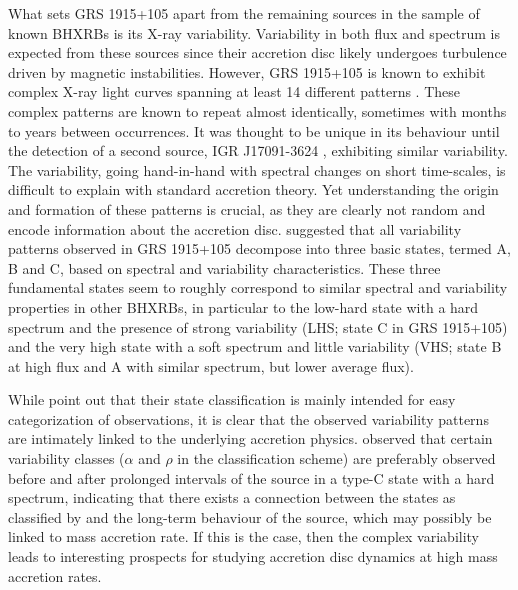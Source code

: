 \documentclass[12pt]{emulateapj}
\begin{document}
What sets GRS 1915+105 apart from the remaining sources in the sample of known BHXRBs is its X-ray variability. Variability in both flux and spectrum is expected from these sources since their accretion disc likely undergoes turbulence driven by magnetic instabilities. However, GRS 1915+105 is known to exhibit complex X-ray light curves spanning at least 14 different patterns \citep{belloni2000, kleinwolt2002, hannikainen2003, hannikainen2005}. These complex patterns are known to repeat almost identically, sometimes with months to years between occurrences. It was thought to be unique in its behaviour until the detection of a second source, IGR J17091-3624 \citep{altamirano2011}, exhibiting similar variability. 
The variability, going hand-in-hand with spectral changes on short time-scales, is difficult to explain with standard accretion theory. Yet understanding the origin and formation of these patterns is crucial, as they are clearly not random and encode information about the accretion disc. \citet{belloni1997a, belloni1997b, belloni2000} suggested that all variability patterns observed in GRS 1915+105 decompose into three basic states, termed A, B and C, based on spectral and variability characteristics. These three fundamental states seem to roughly correspond to similar spectral and variability properties in other BHXRBs, in particular to the low-hard state with a hard spectrum and the presence of strong variability (LHS; state C in GRS 1915+105) and the very high state with a soft spectrum and little variability (VHS; state B at high flux and A with similar spectrum, but lower average flux).

While \citet{belloni2000} point out that their state classification is mainly intended for easy categorization of observations, it is clear that the observed variability patterns are intimately linked to the underlying accretion physics. \citet{naik2002} observed that certain variability classes ($\alpha$ and $\rho$ in the \citealt{belloni2000} classification scheme) are preferably observed before and after prolonged intervals of the source in a type-C state with a hard spectrum, indicating that there exists a connection between the states as classified by \citet{belloni2000} and the long-term behaviour of the source, which may possibly be linked to mass accretion rate. If this is the case, then the complex variability leads to interesting prospects for studying accretion disc dynamics at high mass accretion rates. 
\end{document}
